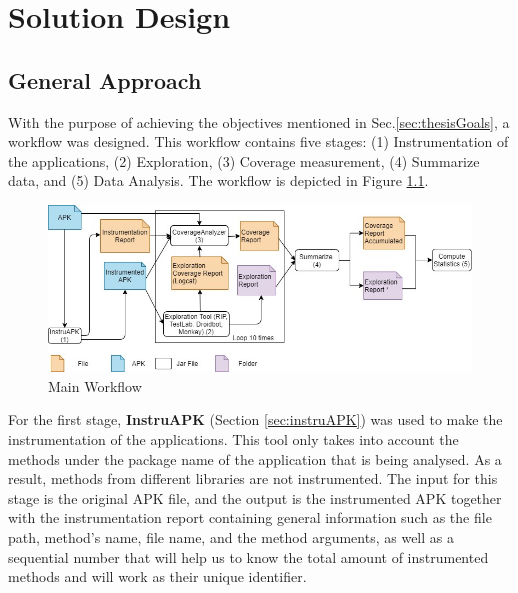 
\chapter{Solution Design} %

\label{Chapter4} %

\section{General Approach} \label{sec:generalApproach}

With the purpose of achieving the objectives mentioned in Sec.\ref{sec:thesisGoals}, a workflow was designed. This workflow contains five stages: (1) Instrumentation of the applications, (2) Exploration, (3) Coverage measurement, (4) Summarize data, and (5)  Data Analysis. The workflow is depicted in Figure \ref{fig:workflow}.

\begin{figure}[h]
\centering
\includegraphics[width=\textwidth]{../Figures/workflow.jpg}
\caption{Main Workflow}\label{fig:workflow}
\end{figure}

For the first stage, \textbf{InstruAPK} (Section \ref{sec:instruAPK}) was used to make the instrumentation of the applications. This tool only takes into account the methods under the package name of the application that is being analysed. As a result, methods from different libraries are not instrumented. The input for this stage is the original APK file, and the output is the instrumented APK together with the instrumentation report containing general information such as the file path, method's name, file name, and the method arguments, as well as a sequential number that will help us to know the total amount of instrumented methods and will work as their unique identifier.

